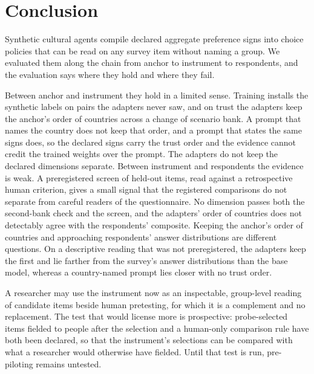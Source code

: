 \section{Conclusion}\label{sec:conclusion}

Synthetic cultural agents compile declared aggregate preference signs into choice policies that can be read on any survey item without naming a group. We evaluated them along the chain from anchor to instrument to respondents, and the evaluation says where they hold and where they fail.

Between anchor and instrument they hold in a limited sense. Training installs the synthetic labels on pairs the adapters never saw, and on trust the adapters keep the anchor's order of countries across a change of scenario bank. A prompt that names the country does not keep that order, and a prompt that states the same signs does, so the declared signs carry the trust order and the evidence cannot credit the trained weights over the prompt. The adapters do not keep the declared dimensions separate. Between instrument and respondents the evidence is weak. A preregistered screen of held-out items, read against a retrospective human criterion, gives a small signal that the registered comparisons do not separate from careful readers of the questionnaire. No dimension passes both the second-bank check and the screen, and the adapters' order of countries does not detectably agree with the respondents' composite. Keeping the anchor's order of countries and approaching respondents' answer distributions are different questions. On a descriptive reading that was not preregistered, the adapters keep the first and lie farther from the survey's answer distributions than the base model, whereas a country-named prompt lies closer with no trust order.

A researcher may use the instrument now as an inspectable, group-level reading of candidate items beside human pretesting, for which it is a complement and no replacement. The test that would license more is prospective: probe-selected items fielded to people after the selection and a human-only comparison rule have both been declared, so that the instrument's selections can be compared with what a researcher would otherwise have fielded. Until that test is run, pre-piloting remains untested.
